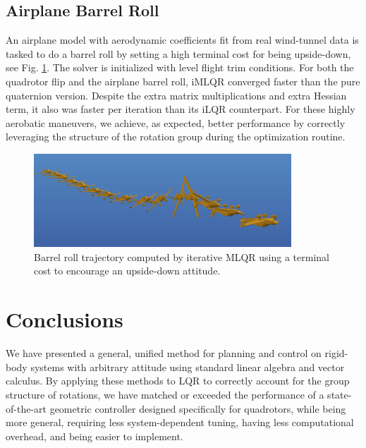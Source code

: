 \documentclass[letterpaper, 10 pt, conference]{ieeeconf}  %
\begin{document}
        \subsection{Airplane Barrel Roll}
        An airplane model with aerodynamic coefficients fit from real wind-tunnel data is
        tasked to do a barrel roll by setting a high terminal cost for being upside-down,
        see Fig. \ref{fig:barrellroll}. The solver is initialized with level flight trim
        conditions. For both the quadrotor flip and the airplane barrel roll, iMLQR
        converged faster than the pure quaternion version. Despite the extra matrix
        multiplications and extra Hessian term, it also was faster per iteration than its
        iLQR counterpart. For these highly aerobatic maneuvers, we achieve, as expected,
        better performance by correctly leveraging the structure of the rotation group
        during the optimization routine.
        
        \begin{figure}[h]
            \centering
            \includegraphics[height=3.5cm]{figures/barrellroll.png}
            \caption{Barrel roll trajectory computed by iterative MLQR using a terminal cost to encourage an upside-down attitude.}
            \label{fig:barrellroll}
        \end{figure}
    

\section{Conclusions} \label{sec:conclusion}
    We have presented a general, unified method for planning and control on rigid-body
    systems with arbitrary attitude using standard linear algebra and vector calculus. By
    applying these methods to LQR to correctly account for the group structure of
    rotations, we have matched or exceeded the performance of a state-of-the-art
    geometric controller designed specifically for quadrotors, while being more general,
    requiring less system-dependent tuning, having less computational overhead, and being
    easier to implement.
    
\end{document}
